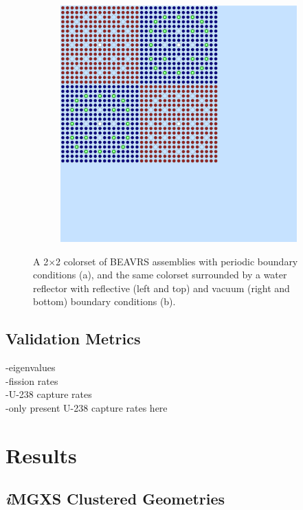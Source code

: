 \documentclass[12pt,twoside]{mitthesis-exec}
\begin{document}
\begin{figure}[h!]
\begin{subfigure}{0.47\textwidth}
  \includegraphics[width=0.9\linewidth]{figures/benchmarks/reflector}
  \caption{}
  \label{fig:reflector}
\end{subfigure}
\caption[A reflected 2$\times$2 colorset]{A 2$\times$2 colorset of BEAVRS assemblies with periodic boundary conditions (a), and the same colorset surrounded by a water reflector with reflective (left and top) and vacuum (right and bottom) boundary conditions (b).}
\label{fig:benchmark-geometries}
\end{figure}

\subsection*{Validation Metrics}

-eigenvalues \\
-fission rates \\
-U-238 capture rates \\
-only present U-238 capture rates here \\

\clearpage

\section*{Results}

\subsection*{\textit{i}MGXS Clustered Geometries}
\end{document}
